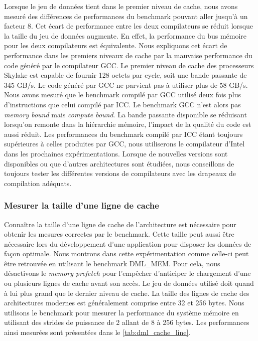         Lorsque le jeu de données tient dans le premier niveau de cache, nous avons mesuré des différences de performances du benchmark pouvant aller jusqu'à un facteur 8. Cet écart de performance entre les deux compilateurs se réduit lorsque la taille du jeu de données augmente. En effet, la performance du bus mémoire pour les deux compilateurs est équivalente. Nous expliquons cet écart de performance dans les premiers niveaux de cache par la mauvaise performance du code généré par le compilateur GCC. Le premier niveau de cache des processeurs Skylake est capable de fournir 128 octets par cycle, soit une bande passante de 345 GB/s. Le code généré par GCC ne parvient pas à utiliser plus de 58 GB/s. Nous avons mesuré que le benchmark compilé par GCC utilisé deux fois plus d'instructions que celui compilé par ICC. Le benchmark GCC n'est alors pas \textit{memory bound} mais \textit{compute bound}. La bande passante disponible se réduisant lorsqu'on remonte dans la hiérarchie mémoire, l'impact de la qualité du code est aussi réduit. Les performances du benchmark compilé par ICC étant toujours supérieures à celles produites par GCC, nous utiliserons le compilateur d'Intel dans les prochaines expérimentations. Lorsque de nouvelles versions sont disponibles ou que d'autres architectures sont étudiées, nous conseillons de toujours tester les différentes versions de compilateurs avec les drapeaux de compilation adéquats.
    
    
    
    \subsubsection{Mesurer la taille d'une ligne de cache}
        Connaître la taille d'une ligne de cache de l'architecture est nécessaire pour obtenir les mesures correctes par le benchmark. Cette taille peut aussi être nécessaire lors du développement d'une application pour disposer les données de façon optimale. Nous montrons dans cette expérimentation comme celle-ci peut être retrouvée en utilisant le benchmark DML\_MEM. Pour cela, nous désactivons le \textit{memory prefetch} pour l'empêcher d'anticiper le chargement d'une ou plusieurs lignes de cache avant son accès. Le jeu de données utilisé doit quand à lui plus grand que le dernier niveau de cache. La taille des lignes de cache des architectures modernes est généralement comprise entre 32 et 256 bytes. Nous utilisons le benchmark pour mesurer la performance du système mémoire en utilisant des strides de puissance de 2 allant de 8 à 256 bytes. Les performances ainsi mesurées sont présentées dans le \autoref{tab:dml_cache_line}.
    

